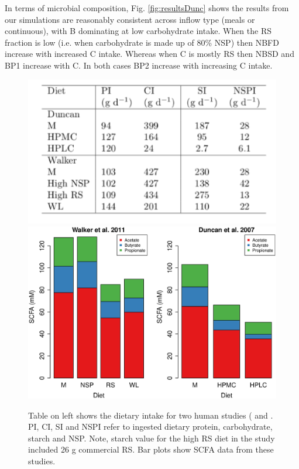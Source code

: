 \documentclass[a4paper]{article}
\begin{document}
In terms of microbial composition, Fig. \ref{fig:resultsDunc} shows the results from our simulations are reasonably consistent across inflow type (meals or continuous), with B dominating at low carbohydrate intake.
When the RS fraction is low (i.e. when carbohydrate is made up of 80\% NSP) then NBFD increase with increased C intake. 
Whereas when C is mostly RS then NBSD and BP1 increase with C. In both cases BP2 increase with increasing C intake.

\begin{figure}
    \centering
    \includegraphics[scale=0.4]{images/Table3.pdf}
    \includegraphics[scale=0.2]{images/InVivoExpts.eps}
    \caption{Table on left shows the dietary intake for two human studies (\cite{duncan} and \cite{walker2011}. PI, CI, SI and NSPI refer to ingested dietary protein, carbohydrate, starch and NSP. Note, starch value for the high RS diet in the \cite{walker2011} study included 26 g commercial RS. Bar plots show SCFA data from these studies.
    }
    \label{fig:Invivo}
\end{figure}
\end{document}
